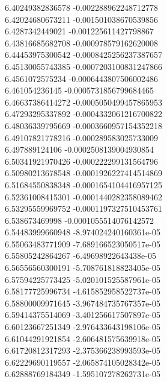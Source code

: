 {6.40249382836578 -0.002288962248712778 \\
6.42024680673211 -0.001501038670539856 \\
6.4287342449021 -0.001225611427798867 \\
6.43816685682708 -0.000978579162620008 \\
6.44453975300542 -0.0008425256237387657 \\
6.45130055743385 -0.0007203100831247866 \\
6.4561072575234 -0.0006443807506002486 \\
6.461054236145 -0.0005731856799684465 \\
6.46637386414272 -0.0005050499457865953 \\
6.47293295337892 -0.0004332061216700822 \\
6.48036339795669 -0.0003660957154352218 \\
6.49107821778216 -0.000289583025733009 \\
6.497889124106 -0.0002508139004930854 \\
6.50341921970426 -0.000222299131564796 \\
6.50980213678548 -0.0001926227414514869 \\
6.51684550838348 -0.0001654104416957125 \\
6.52361008415301 -0.0001440282358089462 \\
6.53295559969752 -0.0001197327510453761 \\
6.538673469998 -0.0001055514076142572 \\
6.54483999660948 -8.974024240160361e-05 \\
6.55063483771909 -7.689166523050517e-05 \\
6.55805242864267 -6.49698922643438e-05 \\
6.56556560300191 -5.708761818823405e-05 \\
6.57594225773425 -5.020101525587961e-05 \\
6.58177725996734 -4.615852958522737e-05 \\
6.58800009971645 -3.967484735767357e-05 \\
6.59414375514069 -3.401256617507897e-05 \\
6.60123667251349 -2.976433643198106e-05 \\
6.61044291921854 -2.606481575639918e-05 \\
6.61720812317293 -2.375366238993593e-05 \\
6.62229690119557 -2.065874105028342e-05 \\
6.62888769184349 -1.595107278262731e-05 \\
}
